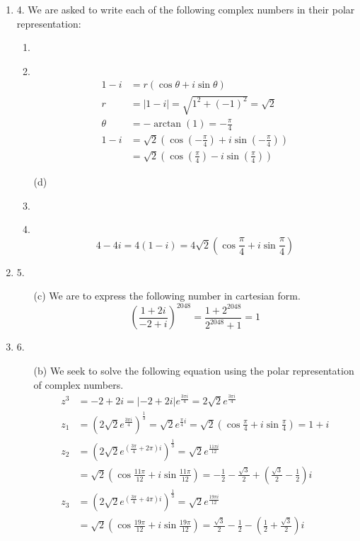 \documentclass[fleqn]{article}
\newenvironment{answers}{ %
	\begin{enumerate}
		\setlength{\itemsep}{\bigskipamount}
}{\end{enumerate}}
\newcommand\Item[1][]{ %
  \ifx\relax#1\relax  \item \else \item[#1] \fi
  \abovedisplayskip=0pt\abovedisplayshortskip=0pt~\vspace*{-\baselineskip}}
\begin{document}
\begin{answers}
	\item[4.]
		We are asked to write each of the following complex numbers in their polar representation:
		\begin{enumerate}
			\Item[(b)]
				\begin{align*}
					1 - i  & = r (\cos \theta + i \sin \theta) \\
					r      & = |1 - i| = \sqrt{1^2 + (-1)^2} = \sqrt{2} \\
					\theta & = -\arctan(1) = -\frac{\pi}{4} \\
					1 - i  & = \sqrt{2}\left( \cos\left( -\frac{\pi}{4} \right) + i\sin\left( -\frac{\pi}{4} \right) \right) \\
					       & = \sqrt{2}\left( \cos\left( \frac{\pi}{4} \right) - i\sin\left( \frac{\pi}{4} \right) \right)
				\end{align*}

			\Item[(d)]
				\begin{equation*}
					4 - 4i = 4(1 - i) = 4\sqrt{2}\left( \cos\frac{\pi}{4} + i\sin\frac{\pi}{4} \right)
				\end{equation*}
		\end{enumerate}

	\item[5.]
		\begin{enumerate}
			\item[(c)]
				We are to express the following number in cartesian form.
				\begin{equation*}
					\left( \frac{1+2i}{-2+i} \right)^{2048} = \frac{1+2^{2048}}{2^{2048}+1} = 1
				\end{equation*}
		\end{enumerate}

	\item[6.]
		\begin{enumerate}
			\item[(b)]
				We seek to solve the following equation using the polar representation of complex numbers.
				\begin{align*}
					z^3 & = -2 + 2i = |-2+2i|e^{\frac{3\pi i}{4}} = 2\sqrt{2}e^{\frac{3\pi i}{4}} \\
					z_1 & = \left( 2\sqrt{2}e^{\frac{3\pi i}{4}} \right)^\frac{1}{3} = \sqrt{2}e^{\frac{\pi}{4}i}  = \sqrt{2}\left( \cos\frac{\pi}{4} + i\sin\frac{\pi}{4} \right) = 1 + i \\
					z_2 & = \left( 2\sqrt{2}e^{\left( \frac{3\pi}{4} + 2\pi \right) i} \right)^\frac{1}{3} = \sqrt{2}e^{\frac{11\pi i}{12}} \\
					    & =  \sqrt{2}\left( \cos\frac{11\pi}{12} + i\sin\frac{11\pi}{12} \right) = -\frac{1}{2} - \frac{\sqrt{3}}{2} + \left( \frac{\sqrt{3}}{2} - \frac{1}{2} \right) i \\
					z_3 & = \left( 2\sqrt{2}e^{\left( \frac{3\pi}{4} + 4\pi \right) i} \right)^\frac{1}{3} = \sqrt{2}e^{\frac{19\pi i}{12}} \\
					    & = \sqrt{2} \left( \cos\frac{19\pi}{12} + i\sin\frac{19\pi}{12} \right) = \frac{\sqrt{3}}{2} - \frac{1}{2} - \left( \frac{1}{2} + \frac{\sqrt{3}}{2} \right) i
				\end{align*}
		\end{enumerate}
\end{answers}
\end{document}
